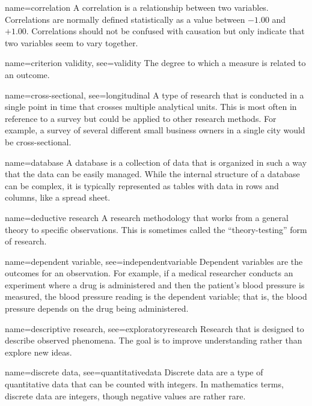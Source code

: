 {name={correlation}}
{%
	A correlation is a relationship between two variables. Correlations are normally defined statistically as a value between $ -1.00 $ and $ +1.00 $. Correlations should not be confused with causation but only indicate that two variables seem to vary together. 
}

{name={criterion validity},
	see={validity}}
{%
	The degree to which a measure is related to an outcome.  
}

{name={cross-sectional},
	see={longitudinal}}
{%
	A type of research that is conducted in a single point in time that crosses multiple analytical units. This is most often in reference to a survey but could be applied to other research methods. For example, a survey of several different small business owners in a single city would be cross-sectional. 
}

{name={database}}
{%
	A database is a collection of data that is organized in such a way that the data can be easily managed. While the internal structure of a database can be complex, it is typically represented as tables with data in rows and columns, like a spread sheet.
}

{name={deductive research}}
{%
	A research methodology that works from a general theory to specific observations. This is sometimes called the ``theory-testing'' form of research.
}

{name={dependent variable},
	see={independentvariable}}
{%
	Dependent variables are the outcomes for an observation. For example, if a medical researcher conducts an experiment where a drug is administered and then the patient's blood pressure is measured, the blood pressure reading is the dependent variable; that is, the blood pressure depends on the drug being administered.
}

{name={descriptive research},
 see={exploratoryresearch}}
{%
	Research that is designed to describe observed phenomena. The goal is to improve 	understanding rather than explore new ideas.
}

{name={discrete data},
	see={quantitativedata}}
{%
	Discrete data are a type of quantitative data that can be counted with integers. In mathematics terms, discrete data are integers, though negative values are rather rare. 
}

